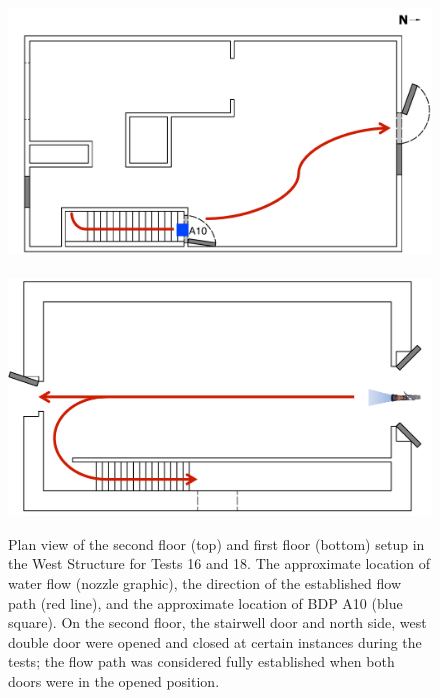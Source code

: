 \documentclass[12pt,oneside]{book}
\begin{document}
\begin{figure}[!ht]
	\includegraphics[width=6in]{../Figures/Floor_Plans/Specific_Tests/West_Hose_Test_2nd_Floor_Annotated}
	\\~\\
	\includegraphics[width=6in]{../Figures/Floor_Plans/Specific_Tests/West_Hose_Test_18_1st_Floor_Annotated}
	\caption[Plan view of the West Structure setup for Tests 16 and 18.]{Plan view of the second floor (top) and first floor (bottom) setup in the West Structure for Tests 16 and 18. The approximate location of water flow (nozzle graphic), the direction of the established flow path (red line), and the approximate location of BDP A10 (blue square). On the second floor, the stairwell door and north side, west double door were opened and closed at certain instances during the tests; the flow path was considered fully established when both doors were in the opened position.}
	\label{fig:flow_path_1}
\end{figure}
\end{document}
